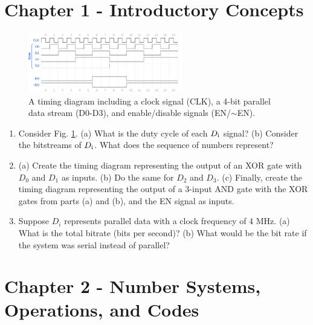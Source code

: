\documentclass[10pt]{article}
\begin{document}
\maketitle

\section{Chapter 1 - Introductory Concepts}
\begin{figure}[ht]
\centering
\includegraphics[width=0.6\textwidth]{timingExample6.pdf}
\caption{\label{fig:timing1} A timing diagram including a clock signal (CLK), a 4-bit parallel data stream (D0-D3), and enable/disable signals (EN/$\sim$EN).}
\end{figure}
\begin{enumerate}
\item Consider Fig. \ref{fig:timing1}. (a) What is the duty cycle of each $D_{\rm i}$ signal? (b) Consider the bitstreams of $D_{\rm i}$.  What does the sequence of numbers represent? \\ \vspace{1.0cm}
\item (a) Create the timing diagram representing the output of an XOR gate with $D_0$ and $D_1$ as inputs. (b) Do the same for $D_2$ and $D_3$.  (c) Finally, create the timing diagram representing the output of a 3-input AND gate with the XOR gates from parts (a) and (b), and the EN signal as inputs. \\ \vspace{2.0cm}
\item Suppose $D_i$ represents parallel data with a clock frequency of 4 MHz.  (a) What is the total bitrate (bits per second)?  (b) What would be the bit rate if the system was serial instead of parallel? \\ \vspace{0.5cm}
\end{enumerate}

\section{Chapter 2 - Number Systems, Operations, and Codes}
\end{document}
